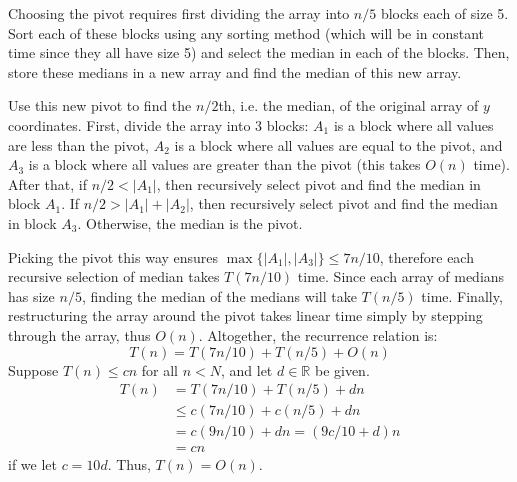 \documentclass{article}
\begin{document}
Choosing the pivot requires first dividing the array into $n/5$ blocks each of size 5. Sort each of these blocks using any sorting method (which will be in constant time since they all have size 5) and select the median in each of the blocks. Then, store these medians in a new array and find the median of this new array.

Use this new pivot to find the $n/2$th, i.e. the median, of the original array of $y$ coordinates. First, divide the array into 3 blocks: $A_1$ is a block where all values are less than the pivot, $A_2$ is a block where all values are equal to the pivot, and $A_3$ is a block where all values are greater than the pivot (this takes $O(n)$ time). After that, if $n/2 < |A_1|$, then recursively select pivot and find the median in block $A_1$. If $n/2 > |A_1|+|A_2|$, then recursively select pivot and find the median in block $A_3$. Otherwise, the median is the pivot.

Picking the pivot this way ensures $\max\{|A_1|, |A_3|\}\leq 7n/10$, therefore each recursive selection of median takes $T(7n/10)$ time. Since each array of medians has size $n/5$, finding the median of the medians will take $T(n/5)$ time. Finally, restructuring the array around the pivot takes linear time simply by stepping through the array, thus $O(n)$. Altogether, the recurrence relation is:
$$T(n)=T(7n/10)+T(n/5)+O(n)$$
Suppose $T(n)\leq cn$ for all $n<N$, and let $d\in \mathbb{R}$ be given.
\begin{align*}
T(n)&=T(7n/10)+T(n/5)+dn \\
&\leq c(7n/10)+c(n/5)+dn \\
&=c(9n/10)+dn=(9c/10+d)n\\
&=cn
\end{align*}
if we let $c=10d$. Thus, $T(n)=O(n)$.
\end{document}
